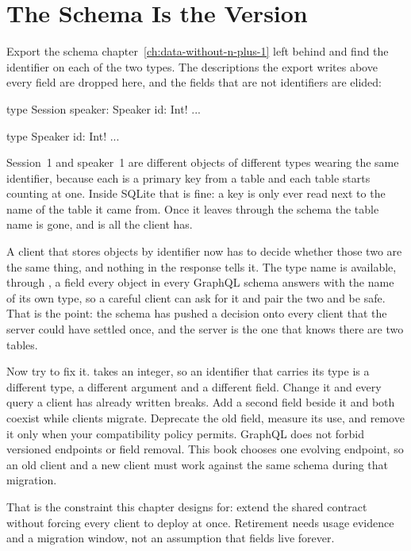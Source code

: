 \section{The Schema Is the Version}
\label{sec:ch04-the-schema-is-the-version}

%
Export the schema chapter~\ref{ch:data-without-n-plus-1} left behind and find
the identifier on each of the two types. The descriptions the export writes
above every field are dropped here, and the fields that are not identifiers
are elided:

\begin{graphqlsdl}
type Session {
  speaker: Speaker
  id: Int!
  ...
}

type Speaker {
  id: Int!
  ...
}
\end{graphqlsdl}

%
Session~1 and speaker~1 are different objects of different types wearing the
same identifier, because each  is a primary key from a table and each
table starts counting at one. Inside SQLite that is fine: a key is only ever
read next to the name of the table it came from. Once it leaves through the
schema the table name is gone, and  is all the client has.

%
%
A client that stores objects by identifier now has to decide whether those two
are the same thing, and nothing in the response tells it.
The type name is available, through , a field every object
in every GraphQL schema answers with the name of its own type, so a careful
client can ask for it and pair the two and be safe. That is the point: the
schema has pushed a decision onto every client
that the server could have settled once, and the server is the one that knows
there are two tables.

%
Now try to fix it.  takes an integer, so an
identifier that carries its type is a different type, a different argument and
a different field. Change it and every query a client has already written
breaks. Add a second field
beside it and both coexist while clients migrate. Deprecate the old field,
measure its use, and remove it only when your compatibility policy permits.
GraphQL does not forbid versioned endpoints or field removal. This book
chooses one evolving endpoint, so an old client and a new client must work
against the same schema during that migration.

%
That is the constraint this chapter designs for: extend the shared contract
without forcing every client to deploy at once. Retirement needs usage
evidence and a migration window, not an assumption that fields live forever.
